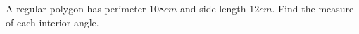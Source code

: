 A regular polygon has perimeter $108cm$ and side length $12cm$. Find the measure of each interior angle.
